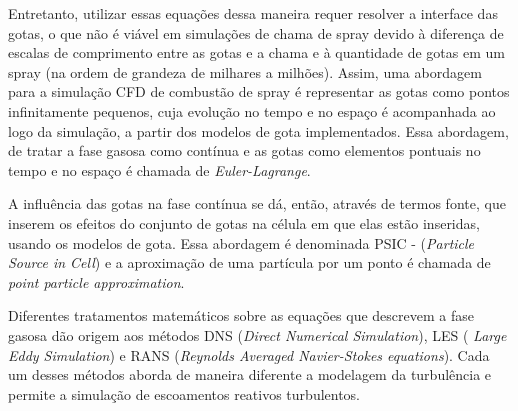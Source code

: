 Entretanto, utilizar essas equações dessa maneira requer resolver a interface das gotas, o que não é viável em simulações de chama de spray devido à diferença de escalas de comprimento entre as gotas e a chama e à quantidade de gotas em um spray (na ordem de grandeza de milhares a milhões).
Assim, uma abordagem para a simulação CFD de combustão de spray é representar as gotas como pontos infinitamente pequenos, cuja evolução no tempo e no espaço é acompanhada ao logo da simulação, a partir dos modelos de gota implementados.
Essa abordagem, de tratar a fase gasosa como contínua e as gotas como elementos pontuais no tempo e no espaço é chamada de \emph{Euler-Lagrange}.

A influência das gotas na fase contínua se dá, então, através de termos fonte, que inserem os efeitos do conjunto de gotas na célula em que elas estão inseridas, usando os modelos de gota. 
Essa abordagem é denominada PSIC - (\emph{Particle Source in Cell}) e a aproximação de uma partícula por um ponto é chamada de \emph{point particle approximation}.

Diferentes tratamentos matemáticos sobre as equações que descrevem a fase gasosa dão origem aos métodos DNS (\emph{Direct Numerical Simulation}), LES ( \emph{Large Eddy Simulation}) e RANS (\emph{Reynolds Averaged Navier-Stokes equations}). 
Cada um desses métodos aborda de maneira diferente a modelagem da turbulência e permite a simulação de escoamentos reativos turbulentos.

